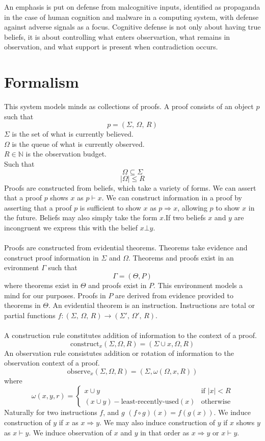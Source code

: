 \documentclass{article}
\begin{document}
	An emphasis is put on defense from malcognitive inputs, identified as propaganda in the case of human cognition and malware in a computing system, with defense against adverse signals as a focus. Cognitive defense is not only about having true beliefs, it is about controlling what enters observartion, what remains in observation, and what support is present when contradiction occurs. 
	\section{Formalism}
	This system models minds as collections of proofs. A proof consists of an object $p$ such that
	$$p = (\Sigma,\,\Omega,\,R)$$
	$\Sigma$ is the set of what is currently believed.\\
	$\Omega$ is the queue of what is currently observed.\\
	$R \in \mathbb{N} $ is the observation budget.\\
	Such that
	$$\Omega \subseteq \Sigma$$
	$$|\Omega| \leq R$$
	Proofs are constructed from beliefs, which take a variety of forms. We can assert that a proof $p$ shows $x$ as $p \vdash x$. We can construct information in a proof by asserting that a proof $p$ is sufficient to show $x$ as $p \Rightarrow x$, allowing $p$ to show $x$ in the future. Beliefs may also simply take the form $x$.If two beliefs $x$ and $y$ are incongruent we express this with the belief $x \bot y$.\\\\
	Proofs are constructed from evidential theorems. Theorems take evidence and construct proof information in $\Sigma$ and $\Omega$. Theorems and proofs exist in an evironment $\Gamma$ such that
	$$\Gamma = (\Theta, P)$$
	where theorems exist in $\Theta$ and proofs exist in $P$. This environment models a mind for our purposes. Proofs in $P$ are derived from evidence provided to theorems in $\Theta$. An evidential theorem is an instruction. Instructions are total or partial functions $f: (\Sigma,\,\Omega,\,R) \rightarrow (\Sigma',\,\Omega',\,R)$.\\\\
	A construction rule constitutes addition of information to the context of a proof.
	$$\text{construct}_x(\Sigma,\Omega,R) = (\Sigma \cup {x}, \Omega, R)$$
	An observation rule consistutes addition or rotation of information to the observation context of a proof.
	$$\text{observe}_x(\Sigma,\Omega,R)=(\Sigma,\omega(\Omega,x,R))$$
	where
	\[
	\omega(x, y, r) =
	\begin{cases}
		x \cup {y} & \text{if } |x| < R \\
		(x \cup {y} ) - \text{least-recently-used}(x) & \text{otherwise}
	\end{cases}
	\]
	Naturally for two instructions $f$, and $g$ $(f \circ g)(x)=f(g(x))$.
	We induce construction of $y$ if $x$ as $x \Rightarrow y$. We may also induce construction of $y$ if $x$ shows $y$ as $x \vdash y$. We induce observation of $x$ and $y$ in that order as $x \Rightarrow y$ or $x \vdash y$.\\\\
\end{document}

